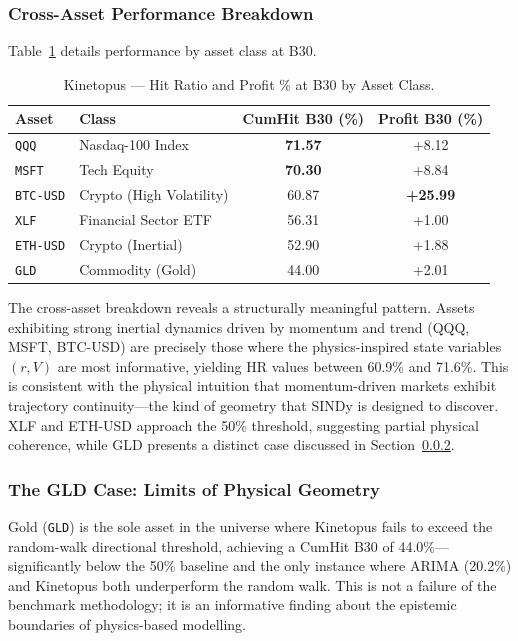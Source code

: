 \documentclass[11pt,a4paper]{article}
\begin{document}
\subsubsection{Cross-Asset Performance Breakdown}
Table~\ref{tab:asset_breakdown} details performance by asset class at B30.

\begin{table}[H]
\centering
\small
\caption{Kinetopus --- Hit Ratio and Profit \% at B30 by Asset Class.}
\label{tab:asset_breakdown}
\begin{tabular}{llcc}
\toprule
\textbf{Asset} & \textbf{Class} & \textbf{CumHit B30 (\%)} & \textbf{Profit B30 (\%)} \\
\midrule
\texttt{QQQ} & Nasdaq-100 Index & \textbf{71.57} & +8.12 \\
\texttt{MSFT} & Tech Equity & \textbf{70.30} & +8.84 \\
\texttt{BTC-USD} & Crypto (High Volatility) & 60.87 & \textbf{+25.99} \\
\texttt{XLF} & Financial Sector ETF & 56.31 & +1.00 \\
\texttt{ETH-USD} & Crypto (Inertial) & 52.90 & +1.88 \\
\texttt{GLD} & Commodity (Gold) & 44.00 & +2.01 \\
\bottomrule
\end{tabular}
\end{table}

The cross-asset breakdown reveals a structurally meaningful pattern. Assets exhibiting strong inertial dynamics driven by momentum and trend (QQQ, MSFT, BTC-USD) are precisely those where the physics-inspired state variables $(r, V)$ are most informative, yielding HR values between 60.9\% and 71.6\%. This is consistent with the physical intuition that momentum-driven markets exhibit trajectory continuity---the kind of geometry that SINDy is designed to discover. XLF and ETH-USD approach the 50\% threshold, suggesting partial physical coherence, while GLD presents a distinct case discussed in Section~\ref{sec:gld_case}.

\subsubsection{The GLD Case: Limits of Physical Geometry}
\label{sec:gld_case}

Gold (\texttt{GLD}) is the sole asset in the universe where Kinetopus fails to exceed the random-walk directional threshold, achieving a CumHit B30 of 44.0\%---significantly below the 50\% baseline and the only instance where ARIMA (20.2\%) and Kinetopus both underperform the random walk. This is not a failure of the benchmark methodology; it is an informative finding about the epistemic boundaries of physics-based modelling.
\end{document}
